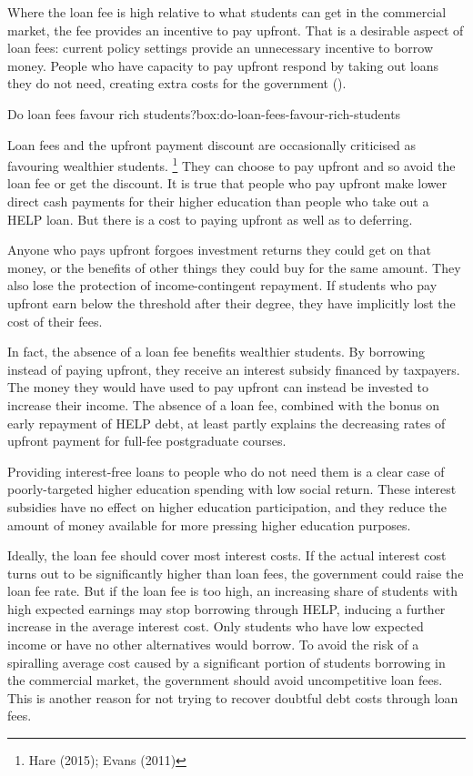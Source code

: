 \documentclass[embargoed]{grattan}
\begin{document}
Where the loan fee is high relative to what students can get in the commercial market, the fee provides an incentive to pay upfront.
That is a desirable aspect of loan fees: current policy settings provide an unnecessary incentive to borrow money.
People who have capacity to pay upfront respond by taking out loans they do not need, creating extra costs for the government ().

\begin{smallbox}{Do loan fees favour rich students?}{box:do-loan-fees-favour-rich-students}

Loan fees and the upfront payment discount are occasionally criticised as favouring wealthier students.%
\footnote{Hare (2015); Evans (2011)} They can choose to pay upfront and so avoid the loan fee or get the discount.
It is true that people who pay upfront make lower direct cash payments for their higher education than people who take out a HELP loan.
But there is a cost to paying upfront as well as to deferring.

Anyone who pays upfront forgoes investment returns they could get on that money, or the benefits of other things they could buy for the same amount.
They also lose the protection of income-contingent repayment.
If students who pay upfront earn below the threshold after their degree, they have implicitly lost the cost of their fees.

In fact, the absence of a loan fee benefits wealthier students.
By borrowing instead of paying upfront, they receive an interest subsidy financed by taxpayers.
The money they would have used to pay upfront can instead be invested to increase their income.
The absence of a loan fee, combined with the bonus on early repayment of HELP debt, at least partly explains the decreasing rates of upfront payment for full-fee postgraduate courses.

Providing interest-free loans to people who do not need them is a clear case of poorly-targeted higher education spending with low social return.
These interest subsidies have no effect on higher education participation, and they reduce the amount of money available for more pressing higher education purposes.
\end{smallbox}

Ideally, the loan fee should cover most interest costs.
If the actual interest cost turns out to be significantly higher than loan fees, the government could raise the loan fee rate.
But if the loan fee is too high, an increasing share of students with high expected earnings may stop borrowing through HELP, inducing a further increase in the average interest cost.
Only students who have low expected income or have no other alternatives would borrow.
To avoid the risk of a spiralling average cost caused by a significant portion of students borrowing in the commercial market, the government should avoid uncompetitive loan fees.
This is another reason for not trying to recover doubtful debt costs through loan fees.
\end{document}
